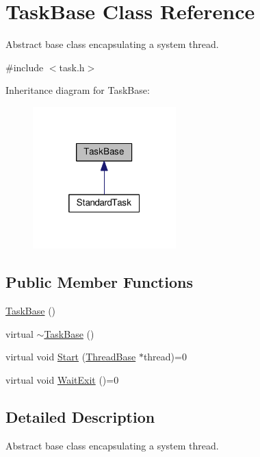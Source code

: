 \hypertarget{classTaskBase}{}\section{Task\+Base Class Reference}
\label{classTaskBase}


Abstract base class encapsulating a system thread.  




{\ttfamily \#include $<$task.\+h$>$}



Inheritance diagram for Task\+Base\+:\nopagebreak
\begin{figure}[H]
\begin{center}
\leavevmode
\includegraphics[width=157pt]{classTaskBase__inherit__graph}
\end{center}
\end{figure}
\subsection*{Public Member Functions}
\begin{DoxyCompactItemize}
\item 
\hyperlink{classTaskBase_ad1abe361d54207f1bb4e0e2f87e8251c}{Task\+Base} ()
\item 
virtual \hyperlink{classTaskBase_a1a2aee27b7a0004691b02b07c25ff041}{$\sim$\+Task\+Base} ()
\item 
virtual void \hyperlink{classTaskBase_a3f6301f160a3016d5ddc3fb0caf675b5}{Start} (\hyperlink{classThreadBase}{Thread\+Base} $\ast$thread)=0
\item 
virtual void \hyperlink{classTaskBase_a96334f8a739ffb1631965b8dd424af76}{Wait\+Exit} ()=0
\end{DoxyCompactItemize}


\subsection{Detailed Description}
Abstract base class encapsulating a system thread. 

